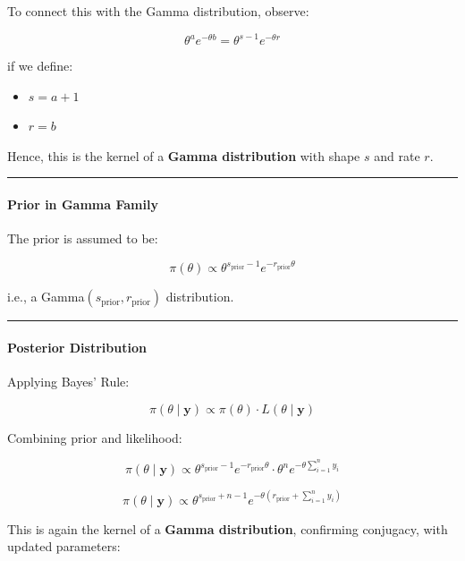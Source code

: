 \documentclass[
]{article}
\providecommand{\tightlist}{%
  \setlength{\itemsep}{0pt}\setlength{\parskip}{0pt}}
\begin{document}
To connect this with the Gamma distribution, observe:

\[
\theta^a e^{-\theta b} = \theta^{s - 1} e^{-\theta r}
\]

if we define:

\begin{itemize}
\tightlist
\item
  \(s = a + 1\)\\
\item
  \(r = b\)
\end{itemize}

Hence, this is the kernel of a \textbf{Gamma distribution} with shape
\(s\) and rate \(r\).

\begin{center}\rule{0.5\linewidth}{0.5pt}\end{center}

\paragraph{Prior in Gamma Family}\label{prior-in-gamma-family}

The prior is assumed to be:

\[
\pi(\theta) \propto \theta^{s_{\text{prior}} - 1} e^{-r_{\text{prior}} \theta}
\]

i.e., a Gamma\((s_{\text{prior}}, r_{\text{prior}})\) distribution.

\begin{center}\rule{0.5\linewidth}{0.5pt}\end{center}

\paragraph{Posterior Distribution}\label{posterior-distribution}

Applying Bayes' Rule:

\[
\pi(\theta \mid \mathbf{y}) \propto \pi(\theta) \cdot L(\theta \mid \mathbf{y})
\]

Combining prior and likelihood:

\[
\pi(\theta \mid \mathbf{y}) \propto \theta^{s_{\text{prior}} - 1} e^{-r_{\text{prior}} \theta} \cdot \theta^n e^{-\theta \sum_{i=1}^n y_i}
\]

\[
\pi(\theta \mid \mathbf{y}) \propto \theta^{s_{\text{prior}} + n - 1} e^{-\theta(r_{\text{prior}} + \sum_{i=1}^n y_i)}
\]

This is again the kernel of a \textbf{Gamma distribution}, confirming
conjugacy, with updated parameters:
\end{document}
